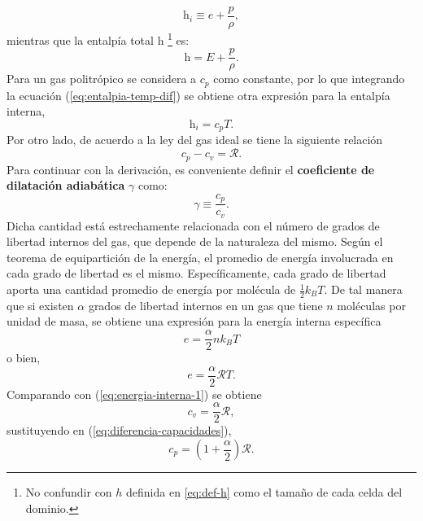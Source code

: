 \begin{equation}
	\mathrm{h}_i \equiv e + \frac{p}{\rho},
	\label{eq:entalpia-1}
\end{equation}
mientras que la entalpía total $\mathrm{h}$ \footnote{No confundir con $h$ definida en \ref{eq:def-h} como el tamaño de cada celda del dominio.} es:
\begin{equation}
	\mathrm{h} = E + \frac{p}{\rho}.
	\label{eq:entalpia-total}
\end{equation}
Para un gas politrópico se considera a $c_p$ como constante, por lo que integrando la ecuación (\ref{eq:entalpia-temp-dif}) se obtiene otra expresión para la entalpía interna,
\begin{equation}
	\mathrm{h}_i = c_p T.
	\label{eq:entalpia-2}
\end{equation}
Por otro lado, de acuerdo a la ley del gas ideal se tiene la siguiente relación
\begin{equation}
	c_p - c_v = \mathcal{R}.
	\label{eq:diferencia-capacidades}
\end{equation}
Para continuar con la derivación, es conveniente definir el \textbf{coeficiente de dilatación adiabática} $\gamma$ como:
\begin{equation}
	\gamma \equiv \frac{c_p}{c_v}.
	\label{eq:gamma-1}
\end{equation}
Dicha cantidad está estrechamente relacionada con el número de grados de libertad internos del gas, que depende de la naturaleza del mismo. Según el teorema de equipartición de la energía, el promedio de energía involucrada en cada grado de libertad es el mismo. Específicamente, cada grado de libertad aporta una cantidad promedio de energía por molécula de $\frac{1}{2}k_B T$. De tal manera que si existen ${\alpha}$ grados de libertad internos en un gas que tiene $n$ moléculas por unidad de masa, se obtiene una expresión para la energía interna específica
\begin{equation}
	e = \frac{\alpha}{2}n k_B T
\end{equation}
o bien, 
\begin{equation}
	e = \frac{\alpha}{2}\mathcal{R} T.
	\label{eq:energia-interna-2}
\end{equation}
Comparando con (\ref{eq:energia-interna-1}) se obtiene
\begin{equation}
	c_v = \frac{\alpha}{2}\mathcal{R},
\end{equation}
sustituyendo en (\ref{eq:diferencia-capacidades}),
\begin{equation}
	c_p = \left(1+\frac{\alpha}{2}\right)\mathcal{R}.
\end{equation}
